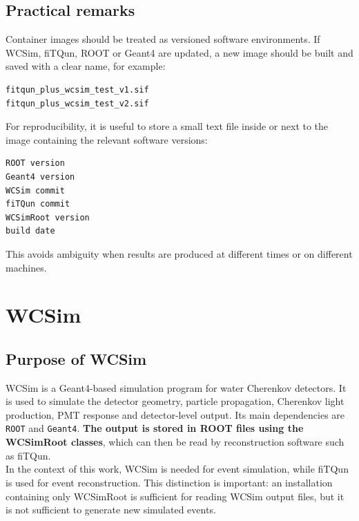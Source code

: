 \documentclass{article}
\numberwithin{table}{subsection}
\numberwithin{figure}{subsection}
\numberwithin{equation}{subsection}
\numberwithin{footnote}{subsection}
\begin{document}
\subsection{Practical remarks}
Container images should be treated as versioned software environments. If WCSim, fiTQun, ROOT or Geant4 are updated, a new image should be built and saved with a clear name, for example:
\begin{lstlisting}[style=terminal]
fitqun_plus_wcsim_test_v1.sif
fitqun_plus_wcsim_test_v2.sif
\end{lstlisting}
For reproducibility, it is useful to store a small text file inside or next to the image containing the relevant software versions:
\begin{lstlisting}[style=terminal]
ROOT version
Geant4 version
WCSim commit
fiTQun commit
WCSimRoot version
build date
\end{lstlisting}
This avoids ambiguity when results are produced at different times or on
different machines.

\section{WCSim}
\label{sec:wcsim}

\subsection{Purpose of WCSim}

WCSim is a Geant4-based simulation program for water Cherenkov detectors.
It is used to simulate the detector geometry, particle propagation, Cherenkov
light production, PMT response and detector-level output. Its main dependencies
are \texttt{ROOT} and \texttt{Geant4}. \textbf{The output is stored in ROOT files using
the WCSimRoot classes}, which can then be read by reconstruction software such
as fiTQun.\\
\newline
In the context of this work, WCSim is needed for event simulation, while fiTQun
is used for event reconstruction. This distinction is important: an installation
containing only WCSimRoot is sufficient for reading WCSim output files, but it is
not sufficient to generate new simulated events.
\end{document}

